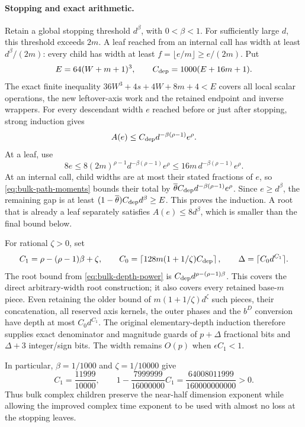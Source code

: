 \paragraph{Stopping and exact arithmetic.}
Retain a global stopping threshold $d^\beta$, with $0<\beta<1$.
For sufficiently large $d$, this threshold exceeds $2m$. A leaf reached
from an internal call has width at least $d^\beta/(2m)$: every child
has width at least $f=\lfloor e/m\rfloor\ge e/(2m)$. Put
\[
 E=64(W+m+1)^3,
 \qquad C_{\rm dep}=1000(E+16m+1).
\]
The exact finite inequality
$36W^3+4s+4W+8m+4<E$ covers all local scalar operations, the new
leftover-axis work and the retained endpoint and inverse wrappers.
For every descendant width $e$ reached before or just after stopping,
strong induction gives
\begin{equation}\label{eq:bulk-depth-power}
 A(e)\le C_{\rm dep}d^{-\beta(\rho-1)}e^\rho.
\end{equation}
At a leaf, use
\[
 8e\le8(2m)^{\rho-1}d^{-\beta(\rho-1)}e^\rho
       \le16m\,d^{-\beta(\rho-1)}e^\rho.
\]
At an internal call, child widths are at most their stated fractions
of $e$, so \eqref{eq:bulk-path-moments} bounds their total by
$\overline\theta C_{\rm dep}d^{-\beta(\rho-1)}e^\rho$.
Since $e\ge d^\beta$, the remaining gap is at least
$(1-\overline\theta)C_{\rm dep}d^\beta\ge E$. This proves the induction.
A root that is already a leaf separately satisfies $A(e)\le8d^\beta$,
which is smaller than the final bound below.

For rational $\zeta>0$, set
\[
 C_1=\rho-(\rho-1)\beta+\zeta,
 \qquad
 C_0=\left\lceil128m(1+1/\zeta)C_{\rm dep}\right\rceil,
 \qquad \Delta=\lceil C_0d^{C_1}\rceil.
\]
The root bound from \eqref{eq:bulk-depth-power} is
$C_{\rm dep}d^{\rho-(\rho-1)\beta}$. This covers the direct arbitrary-width
root construction; it also covers every retained base-$m$ piece.
Even retaining the older bound of
$m(1+1/\zeta)d^\zeta$ such pieces, their concatenation, all reserved
axis kernels, the outer phases and the $b^D$ conversion have depth
at most $C_0d^{C_1}$. The original elementary-depth induction
therefore supplies exact denominator and magnitude guards of
$p+\Delta$ fractional bits and $\Delta+3$ integer/sign bits.
The width remains $O(p)$ when $\epsilon C_1<1$.

In particular, $\beta=1/1000$ and $\zeta=1/10000$ give
\[
 C_1=\frac{11999}{10000},\qquad
 1-\frac{7999999}{16000000}C_1
   =\frac{64008011999}{160000000000}>0.
\]
Thus bulk complex children preserve the near-half dimension exponent
while allowing the improved complex time exponent to be used with
almost no loss at the stopping leaves.
